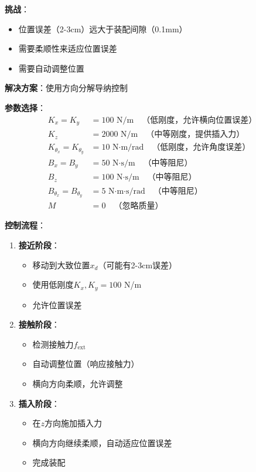 \documentclass[12pt,a4paper]{article}
\begin{document}
\textbf{挑战}：
\begin{itemize}
\item 位置误差（2-3cm）远大于装配间隙（0.1mm）
\item 需要柔顺性来适应位置误差
\item 需要自动调整位置
\end{itemize}

\textbf{解决方案}：使用方向分解导纳控制

\textbf{参数选择}：
\begin{align}
K_x = K_y &= 100 \text{ N/m} \quad \text{（低刚度，允许横向位置误差）} \\
K_z &= 2000 \text{ N/m} \quad \text{（中等刚度，提供插入力）} \\
K_{\theta_x} = K_{\theta_y} &= 10 \text{ N·m/rad} \quad \text{（低刚度，允许角度误差）} \\
B_x = B_y &= 50 \text{ N·s/m} \quad \text{（中等阻尼）} \\
B_z &= 100 \text{ N·s/m} \quad \text{（中等阻尼）} \\
B_{\theta_x} = B_{\theta_y} &= 5 \text{ N·m·s/rad} \quad \text{（中等阻尼）} \\
M &= 0 \quad \text{（忽略质量）}
\end{align}

\textbf{控制流程}：
\begin{enumerate}
\item \textbf{接近阶段}：
\begin{itemize}
\item 移动到大致位置$x_d$（可能有2-3cm误差）
\item 使用低刚度$K_x, K_y = 100$ N/m
\item 允许位置误差
\end{itemize}

\item \textbf{接触阶段}：
\begin{itemize}
\item 检测接触力$f_{\text{ext}}$
\item 自动调整位置（响应接触力）
\item 横向方向柔顺，允许调整
\end{itemize}

\item \textbf{插入阶段}：
\begin{itemize}
\item 在$z$方向施加插入力
\item 横向方向继续柔顺，自动适应位置误差
\item 完成装配
\end{itemize}
\end{enumerate}
\end{document}
